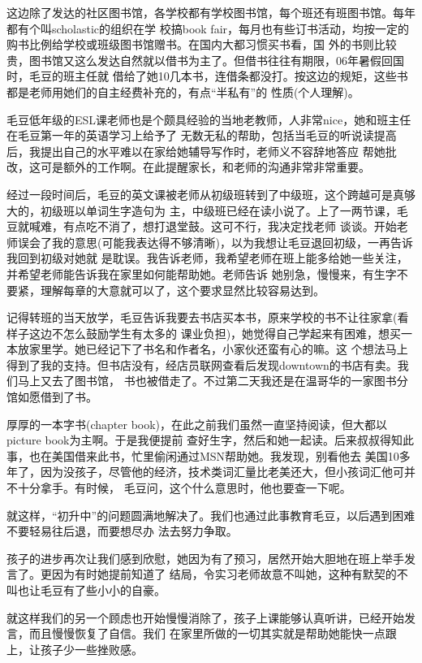 \documentclass[11pt,a4paper,onecolumn]{article}
\begin{document}
这边除了发达的社区图书馆，各学校都有学校图书馆，每个班还有班图书馆。每年都有个叫scholastic的组织在学
校搞book fair，每月也有些订书活动，均按一定的购书比例给学校或班级图书馆赠书。在国内大都习惯买书看，国
外的书则比较贵，图书馆又这么发达自然就以借书为主了。但借书往往有期限，06年暑假回国时，毛豆的班主任就
借给了她10几本书，连借条都没打。按这边的规矩，这些书都是老师用她们的自主经费补充的，有点``半私有''的
性质(个人理解)。


毛豆低年级的ESL课老师也是个颇具经验的当地老教师，人非常nice，她和班主任在毛豆第一年的英语学习上给予了
无数无私的帮助，包括当毛豆的听说读提高后，我提出自己的水平难以在家给她辅导写作时，老师义不容辞地答应
帮她批改，这可是额外的工作啊。在此提醒家长，和老师的沟通非常非常重要。


经过一段时间后，毛豆的英文课被老师从初级班转到了中级班，这个跨越可是真够大的，初级班以单词生字造句为
主，中级班已经在读小说了。上了一两节课，毛豆就喊难，有点吃不消了，想打退堂鼓。这可不行，我决定找老师
谈谈。开始老师误会了我的意思(可能我表达得不够清晰)，以为我想让毛豆退回初级，一再告诉我回到初级对她就
是耽误。我告诉老师，我希望老师在班上能多给她一些关注，并希望老师能告诉我在家里如何能帮助她。老师告诉
她别急，慢慢来，有生字不要紧，理解每章的大意就可以了，这个要求显然比较容易达到。


记得转班的当天放学，毛豆告诉我要去书店买本书，原来学校的书不让往家拿(看样子这边不怎么鼓励学生有太多的
课业负担)，她觉得自己学起来有困难，想买一本放家里学。她已经记下了书名和作者名，小家伙还蛮有心的嘛。这
个想法马上得到了我的支持。但书店没有，经店员联网查看后发现downtown的书店有卖。我们马上又去了图书馆，
书也被借走了。不过第二天我还是在温哥华的一家图书分馆如愿借到了书。


厚厚的一本字书(chapter book)，在此之前我们虽然一直坚持阅读，但大都以picture book为主啊。于是我便提前
查好生字，然后和她一起读。后来叔叔得知此事，也在美国借来此书，忙里偷闲通过MSN帮助她。我发现，别看他去
美国10多年了，因为没孩子，尽管他的经济，技术类词汇量比老美还大，但小孩词汇他可并不十分拿手。有时候，
毛豆问，这个什么意思时，他也要查一下呢。


就这样，``初升中''的问题圆满地解决了。我们也通过此事教育毛豆，以后遇到困难不要轻易往后退，而要想尽办
法去努力争取。

孩子的进步再次让我们感到欣慰，她因为有了预习，居然开始大胆地在班上举手发言了。更因为有时她提前知道了
结局，令实习老师故意不叫她，这种有默契的不叫也让毛豆有了些小小的自豪。

就这样我们的另一个顾虑也开始慢慢消除了，孩子上课能够认真听讲，已经开始发言，而且慢慢恢复了自信。我们
在家里所做的一切其实就是帮助她能快一点跟上，让孩子少一些挫败感。
\end{document}
